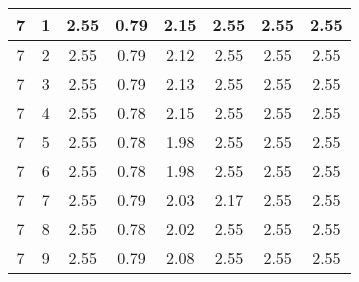 \begin{longtable}{|c|c||c||c|c|c||c|c|}
	7 & 1 & 2.55 & 0.79 & 2.15 & 2.55 & 2.55 & 2.55 \\ \hline
	7 & 2 & 2.55 & 0.79 & 2.12 & 2.55 & 2.55 & 2.55 \\ \hline
	7 & 3 & 2.55 & 0.79 & 2.13 & 2.55 & 2.55 & 2.55 \\ \hline
	7 & 4 & 2.55 & 0.78 & 2.15 & 2.55 & 2.55 & 2.55 \\ \hline
	7 & 5 & 2.55 & 0.78 & 1.98 & 2.55 & 2.55 & 2.55 \\ \hline
	7 & 6 & 2.55 & 0.78 & 1.98 & 2.55 & 2.55 & 2.55 \\ \hline
	7 & 7 & 2.55 & 0.79 & 2.03 & 2.17 & 2.55 & 2.55 \\ \hline
	7 & 8 & 2.55 & 0.78 & 2.02 & 2.55 & 2.55 & 2.55 \\ \hline
	7 & 9 & 2.55 & 0.79 & 2.08 & 2.55 & 2.55 & 2.55 \\ \hline
\end{longtable}
\clearpage{}
